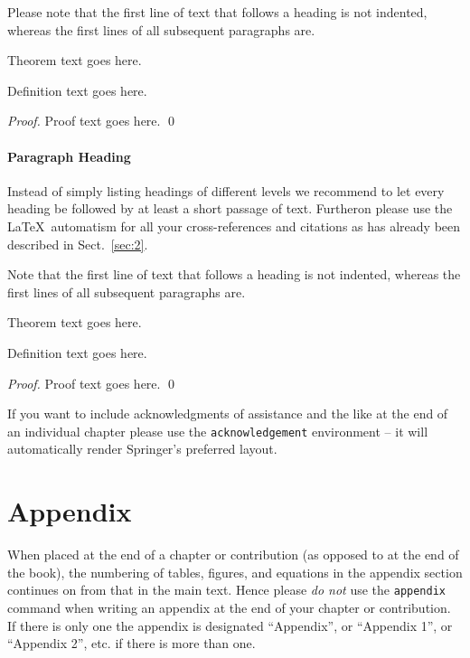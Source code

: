 Please note that the first line of text that follows a heading is not indented, whereas the first lines of all subsequent paragraphs are.

\begin{theorem}
Theorem text goes here.
\end{theorem}
%
%
\begin{definition}
Definition text goes here.
\end{definition}

\begin{proof}
Proof text goes here.
\qed
\end{proof}

\paragraph{Paragraph Heading} %
Instead of simply listing headings of different levels we recommend to let every heading be followed by at least a short passage of text. Furtheron please use the \LaTeX\ automatism for all your cross-references and citations as has already been described in Sect.~\ref{sec:2}.

Note that the first line of text that follows a heading is not indented, whereas the first lines of all subsequent paragraphs are.
%
%
\begin{theorem}
Theorem text goes here.
\end{theorem}
%
\begin{definition}
Definition text goes here.
\end{definition}
%
\begin{proof}
\smartqed
Proof text goes here.
\qed
\end{proof}
%
\begin{acknowledgement}
If you want to include acknowledgments of assistance and the like at the end of an individual chapter please use the \verb|acknowledgement| environment -- it will automatically render Springer's preferred layout.
\end{acknowledgement}
%
\section{Appendix}
%
When placed at the end of a chapter or contribution (as opposed to at the end of the book), the numbering of tables, figures, and equations in the appendix section continues on from that in the main text. Hence please \textit{do not} use the \verb|appendix| command when writing an appendix at the end of your chapter or contribution. If there is only one the appendix is designated ``Appendix'', or ``Appendix 1'', or ``Appendix 2'', etc. if there is more than one.


